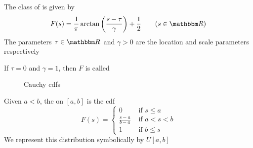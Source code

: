 \begin{frame}

    \Eg
    The class of  is given by 
    \begin{equation*}
        F(s) 
        = \frac{1}{\pi} \arctan\left(  \frac{s - \tau}{\gamma} \right) 
            + \frac{1}{2}
       \qquad (s \in \RR)
    \end{equation*}
    The parameters $\tau \in \RR$ and $\gamma > 0$ are the location
    and scale parameters respectively
    
    If $\tau=0$ and $\gamma=1$, then $F$ is called

\end{frame}

\begin{frame}

    \begin{figure}
       \begin{center}
        \caption{\label{f:cauchy_cdfs} Cauchy {\sc cdf}s }
       \end{center}
    \end{figure}
    
\end{frame}

\begin{frame}

    \vspace{2em}
    \Eg
    Given $a < b$, the  on $[a, b]$ is the
    {\sc cdf} 
    \begin{equation*}
        F(s) = 
        \begin{cases}
            0 & \text{ if } s \leq a
            \\
            \frac{s-a}{b-a} & \text{ if } a < s < b
            \\
            1   & \text{ if }  b \leq s
        \end{cases}
    \end{equation*}
    We represent this distribution symbolically by $U[a, b]$
        
\end{frame}


